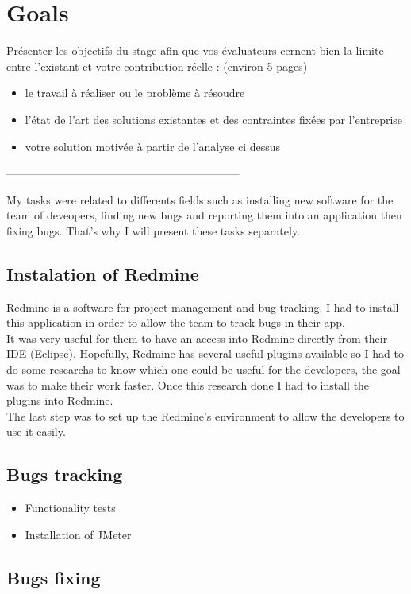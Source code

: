 
\section{Goals}


Présenter les objectifs du stage afin que vos évaluateurs cernent bien la limite entre l’existant et votre contribution réelle : (environ 5 pages)
\begin{itemize}
	\item le travail à réaliser ou le problème à résoudre
	\item l’état de l’art des solutions existantes et des contraintes fixées par l’entreprise
	\item votre solution motivée à partir de l’analyse ci dessus
\end{itemize}


---------------------------------------------------------------

My tasks were related to differents fields such as installing new software for the team of deveopers, finding new bugs and reporting them into an application then fixing bugs. 
That's why I will present these tasks separately. 

\subsection{Instalation of Redmine}
Redmine is a software for project management and bug-tracking. I had to install this application in order to allow the team to track bugs in their app. \\ 
It was very useful for them to have an access into Redmine directly from their IDE (Eclipse). 
Hopefully, Redmine has several useful plugins available so I had to do some researchs to know which one could be useful for the developers, the goal was to make their work faster. Once this research done I had to install the plugins into Redmine. \\ 
The last step was to set up the Redmine's environment to allow the developers to use it easily.


\subsection{Bugs tracking}

\begin{itemize}
	\item Functionality tests
	\item Installation of JMeter
\end{itemize}

\subsection{Bugs fixing}

